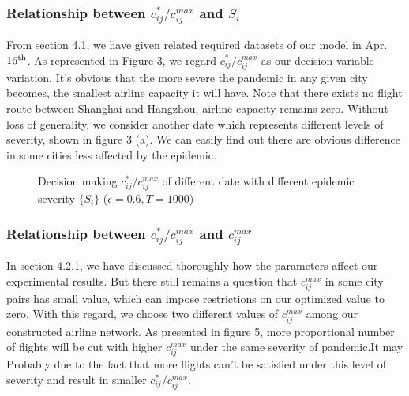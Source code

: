 \subsubsection{Relationship between $c_{ij}^* / c_{ij}^{max}$ and $S_i$}
From section 4.1, we have given related required datasets of our model in Apr.$16^{\rm th}$. As represented in Figure 3, we regard $c_{ij}^* / c_{ij}^{max}$ as our decision variable variation. It's obvious that the more severe the pandemic in any given city becomes, the smallest airline capacity it will have. Note that there exists no flight route between Shanghai and Hangzhou, airline capacity remains zero. Without loss of generality, we consider another date which represents different levels of severity, shown in figure 3 (a). We can easily find out there are 
obvious difference in some cities less affected by the epidemic.

\begin{figure}[H]
    \centering
    \caption{Decision making $c_{ij}^* / c_{ij}^{max}$ of different date with different epidemic severity $\{S_i\}$ ($\epsilon=0.6,T=1000$)}
    \label{fig:my_label}
\end{figure}



\subsubsection{Relationship between $c_{ij}^* / c_{ij}^{max}$ and $c_{ij}^{max}$}
In section 4.2.1, we have discussed thoroughly how the parameters affect our experimental results. But there still remains a question that $c_{ij}^{max}$ in some city pairs has small value, which can impose restrictions on our optimized value to zero. With this regard, we choose two different values of $c_{ij}^{max}$ among our constructed airline network. As presented in figure 5, more proportional number of flights will be cut with higher $c_{ij}^{max}$ under the same severity of pandemic.It may Probably due to the fact that more flights can't be satisfied under this level of severity and result in smaller $c_{ij}^* / c_{ij}^{max}$.




